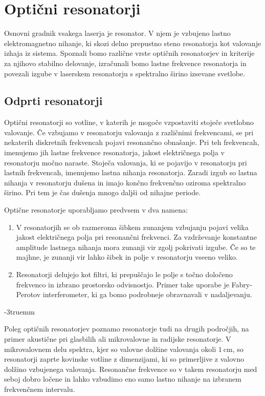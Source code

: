 
\chapter{Optični resonatorji}
Osnovni gradnik vsakega laserja je resonator. V njem je vzbujeno lastno elektromagnetno
nihanje, ki skozi delno prepustno steno resonatorja kot valovanje
izhaja iz sistema. Spoznali bomo različne vrste optičnih resonatorjev in 
kriterije za njihovo stabilno delovanje,
izračunali bomo lastne frekvence resonatorja in povezali izgube v laserskem resonatorju s
spektralno širino izsevane svetlobe.

\section{Odprti resonatorji}
Optični resonatorji so votline, v katerih je mogoče 
vzpostaviti stoječe svetlobno valovanje. Če vzbujamo v resonatorju valovanja z 
različnimi frekvencami, se pri nekaterih diskretnih frekvencah pojavi resonančno
obnašanje. Pri teh frekvencah, imenujemo jih lastne frekvence
resonatorja, jakost električnega polja v resonatorju močno naraste. Stoječa valovanja, ki
se pojavijo v resonatorju pri lastnih frekvencah, imenujemo lastna nihanja resonatorja.
Zaradi izgub so lastna nihanja v resonatorju dušena in imajo končno frekvenčno oziroma spektralno 
širino. Pri tem je čas dušenja mnogo daljši od nihajne periode. 

Optične resonatorje uporabljamo predvsem v dva namena:
\begin{enumerate}
\item V resonatorjih se ob razmeroma šibkem zunanjem vzbujanju pojavi velika jakost
električnega polja pri resonančni frekvenci. Za vzdrževanje
konstantne amplitude lastnega nihanja mora zunanji vir zgolj pokrivati izgube. 
Če so te majhne, je zunanji vir lahko šibek in polje
v resonatorju vseeno veliko.

\item Resonatorji delujejo kot filtri, ki prepuščajo le polje s točno  
določeno frekvenco in izbrano prostorsko odvisnostjo. Primer take uporabe je 
Fabry-Perotov interferometer, ki ga bomo podrobneje
obravnavali v nadaljevanju.
\end{enumerate}
\vglue-3truemm
\begin{remark}
Poleg optičnih resonatorjev poznamo resonatorje tudi na drugih področjih, 
na primer akustične pri glasbilih ali mikrovalovne in radijske resonatorje. 
V mikrovalovnem delu spektra, kjer so valovne dolžine valovanja
okoli $1~\si{\centi\metre}$, 
so resonatorji zaprte kovinske votline z dimenzijami, ki so primerljive z 
valovno dolžino vzbujenega valovanja. Resonančne frekvence so v takem resonatorju 
med seboj dobro ločene in lahko vzbudimo eno samo lastno nihanje na izbranem 
frekvenčnem intervalu.
\end{remark}

